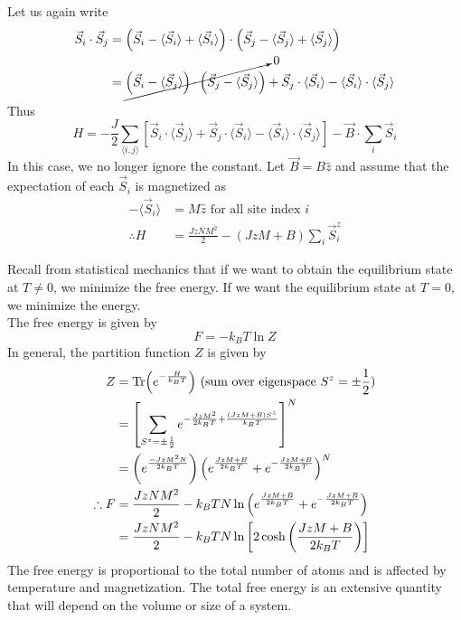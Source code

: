 \documentclass[12pt,a4paper,titlepage]{article}
\newcommand{\trm}[1]{\textrm{#1}} %
\begin{document}
Let us again write
\begin{equation}
\begin{aligned}
\vec{S}_{i}\cdot\vec{S}_{j}&=\left(\vec{S}_{i}-\langle\vec{S}_{i}\rangle+\langle\vec{S}_{i}\rangle\right)\cdot\left(\vec{S}_{j}-\langle\vec{S}_{j}\rangle+\langle\vec{S}_{j}\rangle\right)\\
&=\cancelto{0}{\left(\vec{S}_{i}-\langle\vec{S}_{j}\rangle\right)\cdot\left(\vec{S}_{j}-\langle\vec{S}_{j}\rangle\right)}+\vec{S}_{j}\cdot\langle\vec{S}_{i}\rangle-\langle\vec{S}_{i}\rangle\cdot\langle\vec{S}_{j}\rangle
\end{aligned}
\end{equation}
Thus
\begin{equation}
 H=-\frac{J}{2}\sum_{\langle i,j\rangle}\left[\vec{S}_{i}\cdot\langle\vec{S}_{j}\rangle+\vec{S}_{j}\cdot\langle\vec{S}_{i}\rangle-\langle\vec{S}_{i}\rangle\cdot\langle\vec{S}_{j}\rangle\right]-\vec{B}\cdot\sum_{i}\vec{S}_{i}
\end{equation}
In this case, we no longer ignore the constant. Let $\vec{B}=B\hat{z}$ and assume that the expectation of each $\vec{S}_{i}$ is magnetized as
\begin{equation}
\begin{aligned}
-\langle\vec{S}_{i}\rangle&=M\hat{z}\trm{ for all site index $i$}\\
\therefore H&=\frac{JzNM^{2}}{2}-(JzM+B)\sum_{i}\vec{S}_{i}^{z}
\end{aligned}
\end{equation}

Recall from statistical mechanics that if we want to obtain the equilibrium state at $T\neq0$, we minimize the free energy. If we want the equilibrium state at $T=0$, we minimize the energy.\\

The free energy is given by
\begin{equation}
F=-k_{B}T\ln{Z}
\end{equation}
In general, the partition function $Z$ is given by
\begin{equation}
\begin{aligned}
Z&=\Tr(e^{-\frac{H}{k_{B}T}})\trm{ (sum over eigenspace $S^{z}=\pm\frac{1}{2}$)}\\
&=\left[\sum_{S^{z}=\pm\frac{1}{2}}e^{-\frac{JzM^{2}}{2k_{B}T}+\frac{(JzM+B)S^{z}}{k_{B}T}}\right]^{N}\\
&=\left(e^{\frac{-JzM^{2}N}{2k_{B}T}}\right)\left(e^{\frac{JzM+B}{2k_{B}T}}+e^{-\frac{JzM+B}{2k_{B}T}}\right)^{N}\\
\therefore F&=\frac{JzNM^{2}}{2}-k_{B}TN\ln{\left(e^{\frac{JzM+B}{2k_{B}T}}+e^{-\frac{JzM+B}{2k_{B}T}}\right)}\\
&=\frac{JzNM^{2}}{2}-k_{B}TN\ln{\left[2\cosh\left(\frac{JzM+B}{2k_{B}T}\right)\right]}
\end{aligned}
\end{equation}
The free energy is proportional to the total number of atoms and is affected by temperature and magnetization. The total free energy is an extensive quantity that will depend on the volume or size of a system.\\
\end{document}
